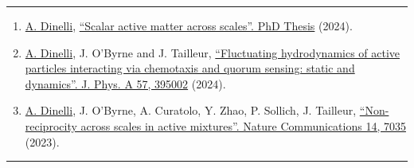 \documentclass{scrartcl}
\begin{document}
\begin{cv}{}
\vspace{1em}

\par\noindent\rule{\textwidth}{0.4pt}

\vspace{1.5em}


\newpage


\noindent{}\vspace{1em}
\small
\begin{enumerate}
\item \underline{A. Dinelli}, \href{https://theses.hal.science/tel-04708958}{``Scalar active matter across scales''. PhD Thesis} (2024).
\item \underline{A. Dinelli}, J. O’Byrne and J. Tailleur, \href{https://iopscience.iop.org/article/10.1088/1751-8121/ad72bc}{``Fluctuating hydrodynamics of active particles interacting via chemotaxis and quorum sensing: static and dynamics''. J. Phys. A 57, 395002} (2024).
\item \underline{A. Dinelli}, J. O’Byrne, A. Curatolo, Y. Zhao, P. Sollich, J. Tailleur, \href{https://doi.org/10.1038/s41467-023-42713-5}{``Non-reciprocity across scales in active mixtures''. Nature Communications 14, 7035} (2023). 
\end{enumerate}
  

\par\noindent\rule{\textwidth}{0.4pt}

\vspace{1.5em}







\noindent{}\vspace{1em}

\def\v{-0.1cm}


\end{cv}
\end{document}
